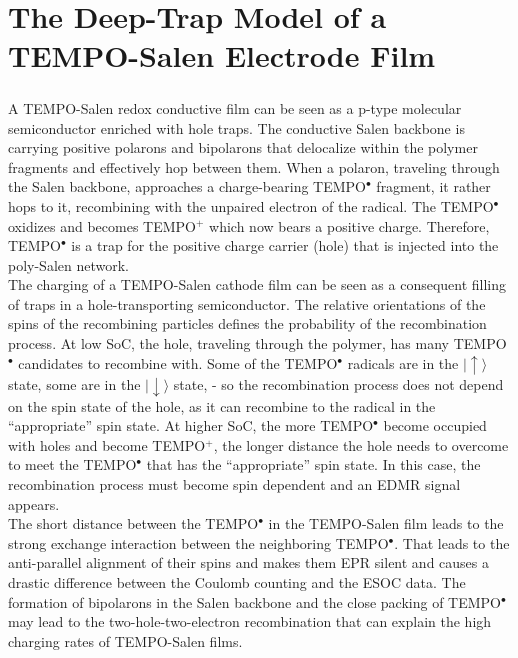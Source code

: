 \chapter{The Deep-Trap Model of a TEMPO-Salen Electrode Film}

\paragraph*{}
A TEMPO-Salen redox conductive film can be seen as a p-type molecular semiconductor enriched with hole traps. The conductive Salen backbone is carrying positive polarons and bipolarons that delocalize within the polymer fragments and effectively hop between them. When a polaron, traveling through the Salen backbone, approaches a charge-bearing TEMPO$^{\bullet}$ fragment, it rather hops to it, recombining with the unpaired electron of the radical. The TEMPO$^{\bullet}$ oxidizes and becomes TEMPO${^+}$ which now bears a positive charge. Therefore, TEMPO$^{\bullet}$ is a trap for the positive charge carrier (hole) that is injected into the poly-Salen network.\\
The charging of a TEMPO-Salen cathode film can be seen as a consequent filling of traps in a hole-transporting semiconductor. The relative orientations of the spins of the recombining particles defines the probability of the recombination process. At low SoC, the hole, traveling through the polymer, has many TEMPO$^{\bullet}$ candidates to recombine with. Some of the TEMPO$^{\bullet}$ radicals are in the $\vert{\uparrow\rangle}$ state, some are in the $\vert{\downarrow\rangle}$ state, - so the recombination process does not depend on the spin state of the hole, as it can recombine to the radical in the ``appropriate'' spin state. At higher SoC, the more TEMPO$^{\bullet}$ become occupied with holes and become TEMPO${^+}$, the longer distance the hole needs to overcome to meet the TEMPO$^{\bullet}$ that has the ``appropriate'' spin state. In this case, the recombination process must become spin dependent and an EDMR signal appears.\\
The short distance between the TEMPO$^{\bullet}$ in the TEMPO-Salen film leads to the strong exchange interaction between the neighboring TEMPO$^{\bullet}$. That leads to the anti-parallel alignment of their spins and makes them EPR silent and causes a drastic difference between the Coulomb counting and the ESOC data. The formation of bipolarons in the Salen backbone and the close packing of TEMPO$^{\bullet}$ may lead to the two-hole-two-electron recombination that can explain the high charging rates of TEMPO-Salen films.




